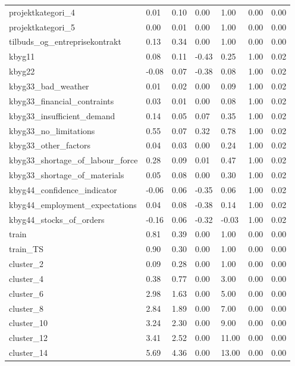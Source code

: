 \begin{landscape}
\begin{longtable}[h!]{lllllll}
projektkategori_4 & 0.01 & 0.10 & 0.00 & 1.00 & 0.00 & 0.00 \\
projektkategori_5 & 0.00 & 0.01 & 0.00 & 1.00 & 0.00 & 0.00 \\
tilbuds_og_entreprisekontrakt & 0.13 & 0.34 & 0.00 & 1.00 & 0.00 & 0.00 \\
kbyg11 & 0.08 & 0.11 & -0.43 & 0.25 & 1.00 & 0.02 \\
kbyg22 & -0.08 & 0.07 & -0.38 & 0.08 & 1.00 & 0.02 \\
kbyg33_bad_weather & 0.01 & 0.02 & 0.00 & 0.09 & 1.00 & 0.02 \\
kbyg33_financial_contraints & 0.03 & 0.01 & 0.00 & 0.08 & 1.00 & 0.02 \\
kbyg33_insufficient_demand & 0.14 & 0.05 & 0.07 & 0.35 & 1.00 & 0.02 \\
kbyg33_no_limitations & 0.55 & 0.07 & 0.32 & 0.78 & 1.00 & 0.02 \\
kbyg33_other_factors & 0.04 & 0.03 & 0.00 & 0.24 & 1.00 & 0.02 \\
kbyg33_shortage_of_labour_force & 0.28 & 0.09 & 0.01 & 0.47 & 1.00 & 0.02 \\
kbyg33_shortage_of_materials & 0.05 & 0.08 & 0.00 & 0.30 & 1.00 & 0.02 \\
kbyg44_confidence_indicator & -0.06 & 0.06 & -0.35 & 0.06 & 1.00 & 0.02 \\
kbyg44_employment_expectations & 0.04 & 0.08 & -0.38 & 0.14 & 1.00 & 0.02 \\
kbyg44_stocks_of_orders & -0.16 & 0.06 & -0.32 & -0.03 & 1.00 & 0.02 \\
train & 0.81 & 0.39 & 0.00 & 1.00 & 0.00 & 0.00 \\
train_TS & 0.90 & 0.30 & 0.00 & 1.00 & 0.00 & 0.00 \\
cluster_2 & 0.09 & 0.28 & 0.00 & 1.00 & 0.00 & 0.00 \\
cluster_4 & 0.38 & 0.77 & 0.00 & 3.00 & 0.00 & 0.00 \\
cluster_6 & 2.98 & 1.63 & 0.00 & 5.00 & 0.00 & 0.00 \\
cluster_8 & 2.84 & 1.89 & 0.00 & 7.00 & 0.00 & 0.00 \\
cluster_10 & 3.24 & 2.30 & 0.00 & 9.00 & 0.00 & 0.00 \\
cluster_12 & 3.41 & 2.52 & 0.00 & 11.00 & 0.00 & 0.00 \\
cluster_14 & 5.69 & 4.36 & 0.00 & 13.00 & 0.00 & 0.00 \\
\end{longtable}\end{landscape}
